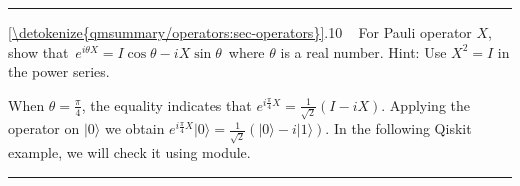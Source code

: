 \documentclass[letterpaper,10pt,english]{jupyterBook}
\begin{document}
\bigskip\hrule\bigskip


\sphinxAtStartPar
{} \hyperref[\detokenize{qmsummary/operators:sec-operators}]{\ref{\detokenize{qmsummary/operators:sec-operators}}}.10     For Pauli operator \(X\), show that \(\,e^{i \theta X} = I \cos \theta - i X \sin \theta \,\) where \(\theta\) is a real number. Hint: Use \(X^2=I\) in the power series.

\sphinxAtStartPar
When \(\theta=\frac{\pi}{4}\), the equality indicates that \(e^{i \frac{\pi}{4} X} = \frac{1}{\sqrt{2}}  ( I - i X)\).  Applying the operator on \(|0\rangle\) we obtain \(e^{i \frac{\pi}{4} X}|0\rangle = \frac{1}{\sqrt{2}} \left (|0\rangle  - i |1\rangle \right)\).
In the following Qiskit example, we will check it using  module.


\bigskip\hrule\bigskip
\end{document}
